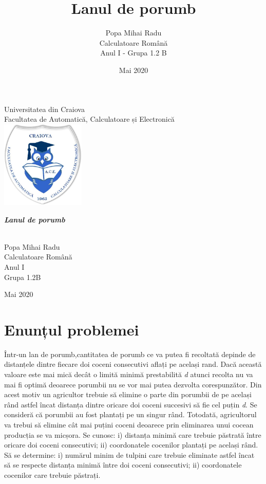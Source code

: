 \documentclass[11pt,a4paper]{article}
\title{Lanul de porumb}
\author{Popa Mihai Radu \\Calculatoare Română\\Anul I - Grupa 1.2 B}
\date{Mai 2020}
\begin{document}
\begin{titlepage}
    \begin{center}
    \large
    Universitatea din Craiova\\
    Facultatea de Automatică, Calculatoare și Electronică\\
    \vspace{0.5cm}
        \includegraphics[width=0.3\textwidth]{ace.jpg}
    \vspace{2cm}
    
    \huge{\textbf{\textit{Lanul de porumb}}}
    
    \vspace{1cm}
    
    \large \textbf\\ Popa Mihai Radu\\
    \large{Calculatoare Română}\\
    \large{Anul I}\\
    \large{Grupa 1.2B}\\
    \vfill
    
    \vspace{1cm}
    
    \large
    Mai 2020
    
    \end{center}
    
\end{titlepage}

\section{Enunțul problemei}
 Într-un lan de porumb,cantitatea de porumb ce va putea fi recoltată depinde de distanțele dintre fiecare doi coceni consecutivi aflați pe același rand. Dacă această valoare este mai mică decât o limită minimă prestabilită \emph{d} atunci recolta nu va mai fi optimă deoarece porumbii nu se vor mai putea dezvolta corespunzător. Din acest motiv un agricultor trebuie să elimine o parte din porumbii de pe același rând astfel încat distanța dintre oricare doi coceni succesivi să fie cel puțin \emph{d}. Se consideră că porumbii au fost plantați pe un singur rând. Totodată, agricultorul va trebui să elimine cât mai puțini coceni deoarece prin eliminarea unui cocean producția se va micșora. Se cunosc: i) distanța minimă care trebuie păstrată între oricare doi coceni consecutivi; ii) coordonatele cocenilor plantați pe același rând. Să se determine: i) numărul minim de tulpini care trebuie eliminate astfel încat să se respecte distanța minimă între doi coceni consecutivi; ii) coordonatele cocenilor care trebuie păstrați.
 
\end{document}
